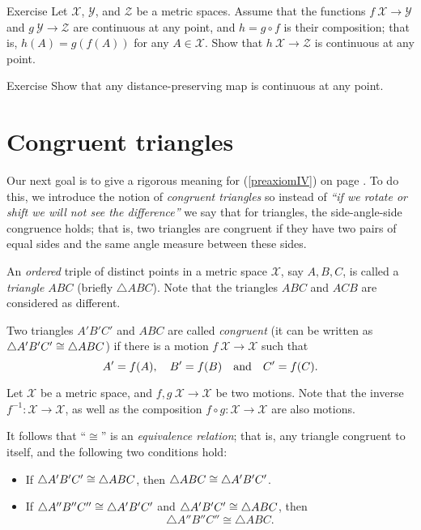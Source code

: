 \begin{thm}{Exercise}\label{ex:comp+cont}
Let $\mathcal{X}$, $\mathcal{Y}$, and $\mathcal{Z}$ be a metric spaces.
Assume that the functions $f\:\mathcal{X}\to\mathcal{Y}$
and $g\:\mathcal{Y}\to\mathcal{Z}$ are continuous at any point,
and $h=g\circ f$ is their composition;
that is, $h(A)=g(f(A))$ for any $A\in \mathcal{X}$.
Show that $h\:\mathcal{X}\to\mathcal{Z}$ is continuous at any point.
\end{thm}

\begin{thm}{Exercise}\label{ex:isom-cont}
Show that any distance-preserving map is continuous at any point.
\end{thm}




\section*{Congruent triangles} 

Our next goal is to give a rigorous meaning for (\ref{preaxiomIV}) on page \pageref{preaxiomIV}.
To do this, we introduce the notion of {}\emph{congruent triangles}
so instead of {}\emph{``if we rotate or shift we will not see the difference''} we say that for triangles, the side-angle-side congruence holds;
that is, two triangles are congruent if they have two pairs of equal sides and the same angle measure between these sides.

An {}\emph{ordered} triple of distinct points in a metric space $\mathcal{X}$, 
say $A,B,C$,
is called a \emph{triangle $ABC$}\label{page:def:triangle} (briefly $\triangle A B C$).
Note that the triangles $A B C$ and $A C B$ are considered as different.

Two triangles $A' B' C'$ and $A B C$ are called 
\emph{congruent}
(it can be written as $\triangle A' B' C'\z\cong\triangle A B C$) if there is a motion $f\:\mathcal{X}\to\mathcal{X}$ such that 
\[A'\z=f(A),
\quad
B'=f(B)
\quad
\text{and}
\quad
C'=f(C).\]

Let $\mathcal X$ be a metric space,
and $f,g\:\mathcal X\to\mathcal X$ be two motions.
Note that the inverse $f^{-1}:\mathcal X\to\mathcal X$,
as well as the composition $f\circ g:\mathcal X\to\mathcal X$
are also motions.

It follows that ``$\cong$'' is an \emph{equivalence relation};
that is, any triangle congruent to itself, 
and the following two conditions hold:
\begin{itemize} 
\item If $\triangle A' B' C'\z\cong\triangle A B C$, then $\triangle A B C\z\cong\triangle A' B' C'$.
\item If $\triangle A'' B'' C''\z\cong\triangle A' B' C'$ and $\triangle A' B' C'\z\cong\triangle A B C$,
then 
$$\triangle A'' B'' C''\cong\triangle A B C.$$
\end{itemize}


